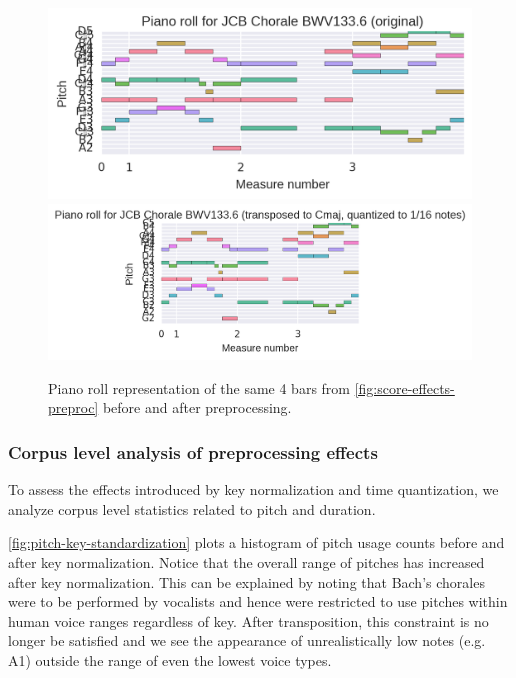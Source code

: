 \begin{figure}[tb]
    \centering
        \includegraphics[width=1.0\linewidth]{bwv133-6-original-piano-roll.png}
        \includegraphics[width=1.0\linewidth]{bwv133-6-preproc-piano-roll.png}
    \caption{Piano roll representation of the same 4 bars from \cref{fig:score-effects-preproc}
    before and after preprocessing.}
    \label{fig:piano-roll-effects-preproc}
\end{figure}

\subsubsection{Corpus level analysis of preprocessing effects}

To assess the effects introduced by key normalization and time quantization,
we analyze corpus level statistics related to pitch and duration.

\cref{fig:pitch-key-standardization} plots a histogram of pitch usage counts
before and after key normalization. Notice that the overall range of pitches
has increased after key normalization. This can be explained by noting that
Bach's chorales were to be performed by vocalists and hence were restricted to
use pitches within human voice ranges regardless of key. After transposition,
this constraint is no longer be satisfied and we see the appearance of
unrealistically low notes (e.g. A1) outside the range of even the lowest voice
types.

